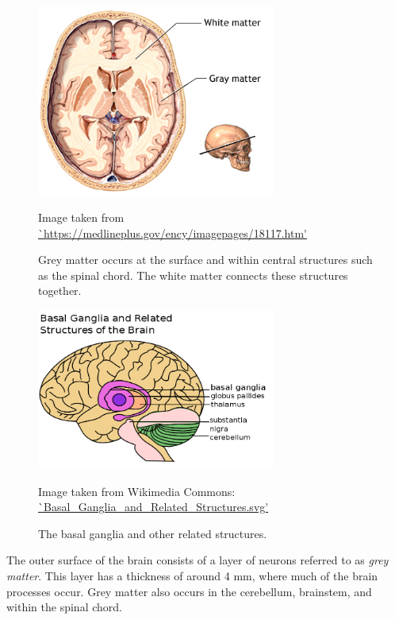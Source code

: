 \begin{figure}[ht]
	\centering
	\includegraphics[width=0.7\textwidth]{Images/2_white_vs_grey.png}
	\caption{Grey matter occurs at the surface and within central structures such as the spinal chord. The white matter connects these structures together.}
	\small Image taken from \url{`https://medlineplus.gov/ency/imagepages/18117.htm'}
	\label{svd-greywhitefig}
\end{figure}


\begin{figure}[ht]
	\centering
	\includegraphics[width=0.7\textwidth]{Images/2_Basal_Ganglia_and_Related_Structures.png}
	\caption{The basal ganglia and other related structures.}
	\small Image taken from Wikimedia Commons: \url{`Basal_Ganglia_and_Related_Structures.svg'}
	\label{svd-basalfig}
\end{figure}


The outer surface of the brain consists of a layer of neurons referred to as \textit{grey matter}. This layer has a thickness of around 4 mm, where much of the brain processes occur. Grey matter also occurs in the cerebellum, brainstem, and within the spinal chord.

